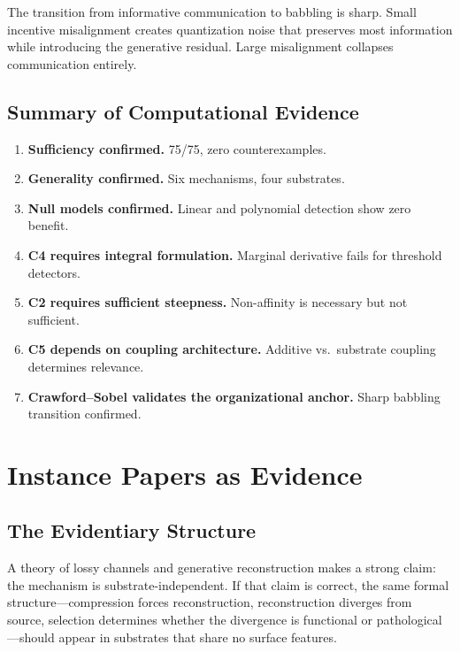 \documentclass[12pt,letterpaper]{article}
\theoremstyle{definition}
\theoremstyle{remark}
\begin{document}
The transition from informative communication to babbling is sharp. Small incentive misalignment creates quantization noise that preserves most information while introducing the generative residual. Large misalignment collapses communication entirely.


\subsection{Summary of Computational Evidence}

\begin{enumerate}
    \item \textbf{Sufficiency confirmed.} 75/75, zero counterexamples.
    \item \textbf{Generality confirmed.} Six mechanisms, four substrates.
    \item \textbf{Null models confirmed.} Linear and polynomial detection show zero benefit.
    \item \textbf{C4 requires integral formulation.} Marginal derivative fails for threshold detectors.
    \item \textbf{C2 requires sufficient steepness.} Non-affinity is necessary but not sufficient.
    \item \textbf{C5 depends on coupling architecture.} Additive vs.\ substrate coupling determines relevance.
    \item \textbf{Crawford--Sobel validates the organizational anchor.} Sharp babbling transition confirmed.
\end{enumerate}


\section{Instance Papers as Evidence}
\label{sec:instances}

\subsection{The Evidentiary Structure}

A theory of lossy channels and generative reconstruction makes a strong claim: the mechanism is substrate-independent. If that claim is correct, the same formal structure---compression forces reconstruction, reconstruction diverges from source, selection determines whether the divergence is functional or pathological---should appear in substrates that share no surface features.
\end{document}
